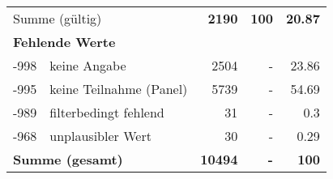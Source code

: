 \begin{longtable}{lXrrr}
     \midrule
     \multicolumn{2}{l}{Summe (gültig)} &
       \textbf{\num{2190}} &
     \textbf{\num{100}} &
       \textbf{\num[round-mode=places,round-precision=2]{20.87}} \\
     \multicolumn{5}{l}{\textbf{Fehlende Werte}}\\
       -998 &
       keine Angabe &
         \num{2504} &
        - &
         \num[round-mode=places,round-precision=2]{23.86} \\
       -995 &
       keine Teilnahme (Panel) &
         \num{5739} &
        - &
         \num[round-mode=places,round-precision=2]{54.69} \\
       -989 &
       filterbedingt fehlend &
         \num{31} &
        - &
         \num[round-mode=places,round-precision=2]{0.3} \\
       -968 &
       unplausibler Wert &
         \num{30} &
        - &
         \num[round-mode=places,round-precision=2]{0.29} \\
     \midrule
     \multicolumn{2}{l}{\textbf{Summe (gesamt)}} &
          \textbf{\num{10494}} &
        \textbf{-} &
        \textbf{\num{100}} \\
     \bottomrule
     \end{longtable}
     
